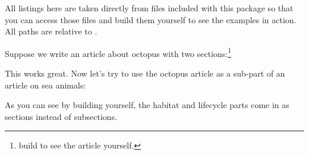 
All listings here are taken directly from files included with this package so that you can access those files and build them yourself to see the examples in action.
All paths are relative to .

Suppose we write an article about octopus with two sections:\footnote{build  to see the article yourself.}








This works great.
Now let's try to use the octopus article as a sub-part of an article on sea animals:


As you can see by building  yourself, the habitat and lifecycle parts come in as sections instead of subsections.

